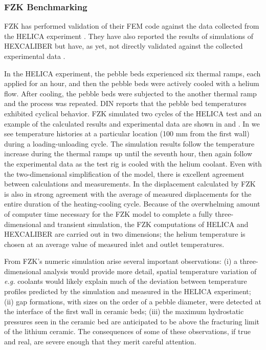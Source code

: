 \subsubsection{FZK Benchmarking}
FZK has performed validation of their FEM code against the data collected from the HELICA experiment \cite{Gan:2008kx}. They have also reported the results of simulations of HEXCALIBER but have, as yet, not directly validated against the collected experimental data \cite{Gan:2009vn}.

In the HELICA experiment, the pebble beds experienced six thermal ramps, each applied for an hour, and then the pebble beds were actively cooled with a helium flow. After cooling, the pebble beds were subjected to the another thermal ramp and the process was repeated. DIN reports\cite{dellorco:2006} that the pebble bed temperatures exhibited cyclical behavior. FZK simulated two cycles of the HELICA test and an example of the calculated results and experimental data are shown in  and . In  we see temperature histories at a particular location (100 mm from the first wall) during a loading-unloading cycle. The simulation results follow the temperature increase during the thermal ramps up until the seventh hour, then again follow the experimental data as the test rig is cooled with the helium coolant. Even with the two-dimensional simplification of the model, there is excellent agreement between calculations and measurements. In  the displacement calculated by FZK is also in strong agreement with the average of measured displacements for the entire duration of the heating-cooling cycle. Because of the overwhelming amount of computer time necessary for the FZK model to complete a fully three-dimensional and transient simulation, the FZK computations of HELICA and HEXCALIBER are carried out in two dimensions; the helium temperature is chosen at an average value of measured inlet and outlet temperatures.

From FZK's numeric simulation arise several important observations: (i) a three-dimensional analysis would provide more detail, spatial temperature variation of \textit{e.g.} coolants would likely explain much of the deviation between temperature profiles predicted by the simulation and measured in the HELICA experiment; (ii) gap formations, with sizes on the order of a pebble diameter, were detected at the interface of the first wall in ceramic beds; (iii) the maximum hydrostatic pressures seen in the ceramic bed are anticipated to be above the fracturing limit of the lithium ceramic. The consequences of some of these observations, if true and real, are severe enough that they merit careful attention. 

